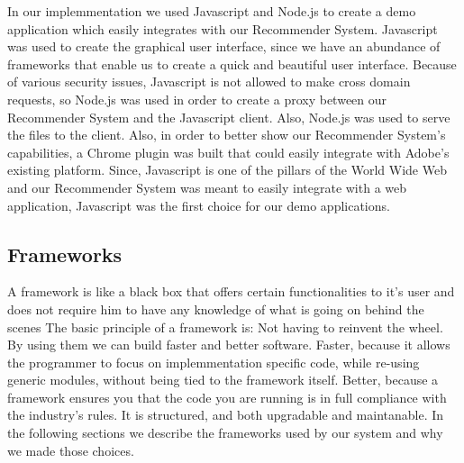 In our implemmentation we used Javascript and Node.js to create a demo application which easily integrates with our Recommender System. Javascript was used to create the graphical user interface, since we have an abundance of frameworks that enable us to create a quick and beautiful user interface. Because of various security issues, Javascript is not allowed to make cross domain requests, so Node.js was used in order to create a proxy between our Recommender System and the Javascript client. Also, Node.js was used to serve the files to the client.
Also, in order to better show our Recommender System's capabilities, a Chrome plugin was built that could easily integrate with Adobe's existing platform.
Since, Javascript is one of the pillars of the World Wide Web and our Recommender System was meant to easily integrate with a web application, Javascript was the first choice for our demo applications.


\subsection{Frameworks}
\label{sec:frameworks}
A framework is like a black box that offers certain functionalities to it's user and does not require him to have any knowledge of what is going on behind the scenes
The basic principle of a framework is: Not having to reinvent the wheel. By using them we can build faster and better software.
Faster, because it allows the programmer to focus on implemmentation specific code, while re-using generic modules, without being tied to the framework itself.
Better, because a framework ensures you that the code you are running is in full compliance with the industry's rules. It is structured, and both upgradable and maintanable.
In the following sections we describe the frameworks used by our system and why we made those choices.

